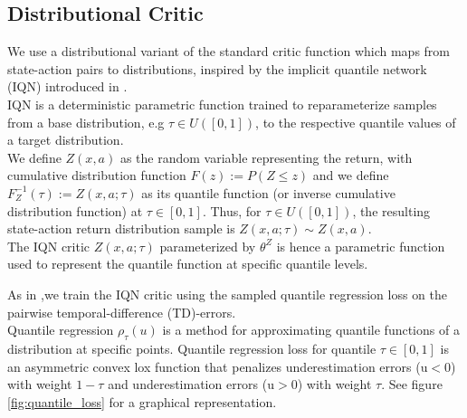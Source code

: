 \subsection{Distributional Critic}
We use a distributional variant of the standard critic function
which maps from state-action pairs to distributions, inspired by the implicit quantile network (IQN) introduced in \cite{Dabney2018b}.\\
IQN is a deterministic parametric function trained to reparameterize samples from a
base distribution, e.g $\tau \in U([0,1])$, to the respective
quantile values of a target distribution.\\
We define $Z(x,a)$ as the random variable representing the return, with cumulative 
distribution function $F(z):=P(Z\leq z)$ and we define $F^{-1}_Z(\tau):=Z(x,a;\tau)$ as its quantile function 
(or inverse cumulative distribution function)
at $\tau \in [0,1]$.
Thus, for $\tau \in U([0,1])$, the resulting state-action return distribution sample is
$Z(x,a;\tau)\sim Z(x,a)$.\\
The IQN critic $Z(x,a;\tau)$ parameterized by $\theta^Z$  is hence a parametric function
used to represent the quantile function at specific quantile levels.

As in \citet{Dabney2018b},we train the IQN critic using the sampled quantile regression
loss \citep{koenker2005} on the pairwise temporal-difference (TD)-errors.\\
Quantile regression $\rho_{\tau}(u)$ is a method for approximating quantile functions of a distribution at specific points.
Quantile regression loss for quantile $\tau \in [0,1]$ is an asymmetric convex lox function
that penalizes underestimation errors (u$<$0) with weight $1-\tau$ and underestimation
errors (u$>$0) with weight $\tau$. See figure \ref{fig:quantile_loss} for a graphical representation. 

